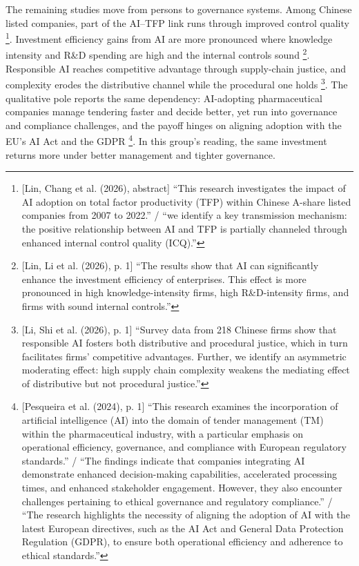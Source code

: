 The remaining studies move from persons to governance systems. Among Chinese listed companies, part of the AI--TFP link runs through improved control quality \parencite[abstract]{lin2026navigating}\footnote{[Lin, Chang et al. (2026), abstract] ``This research investigates the impact of AI adoption on total factor productivity (TFP) within Chinese A-share listed companies from 2007 to 2022.'' / ``we identify a key transmission mechanism: the positive relationship between AI and TFP is partially channeled through enhanced internal control quality (ICQ).''}. Investment efficiency gains from AI are more pronounced where knowledge intensity and R\&D spending are high and the internal controls sound \parencite[p.~1]{lin2026role}\footnote{[Lin, Li et al. (2026), p. 1] ``The results show that AI can significantly enhance the investment efficiency of enterprises. This effect is more pronounced in high knowledge-intensity firms, high R\&D-intensity firms, and firms with sound internal controls.''}. Responsible AI reaches competitive advantage through supply-chain justice, and complexity erodes the distributive channel while the procedural one holds \parencite[p.~1]{li2026firms}\footnote{[Li, Shi et al. (2026), p. 1] ``Survey data from 218 Chinese firms show that responsible AI fosters both distributive and procedural justice, which in turn facilitates firms' competitive advantages. Further, we identify an asymmetric moderating effect: high supply chain complexity weakens the mediating effect of distributive but not procedural justice.''}. The qualitative pole reports the same dependency: AI-adopting pharmaceutical companies manage tendering faster and decide better, yet run into governance and compliance challenges, and the payoff hinges on aligning adoption with the EU's AI Act and the GDPR \parencite[p.~1]{pesqueira2024exploring}\footnote{[Pesqueira et al. (2024), p. 1] ``This research examines the incorporation of artificial intelligence (AI) into the domain of tender management (TM) within the pharmaceutical industry, with a particular emphasis on operational efficiency, governance, and compliance with European regulatory standards.'' / ``The findings indicate that companies integrating AI demonstrate enhanced decision-making capabilities, accelerated processing times, and enhanced stakeholder engagement. However, they also encounter challenges pertaining to ethical governance and regulatory compliance.'' / ``The research highlights the necessity of aligning the adoption of AI with the latest European directives, such as the AI Act and General Data Protection Regulation (GDPR), to ensure both operational efficiency and adherence to ethical standards.''}. In this group's reading, the same investment returns more under better management and tighter governance.

